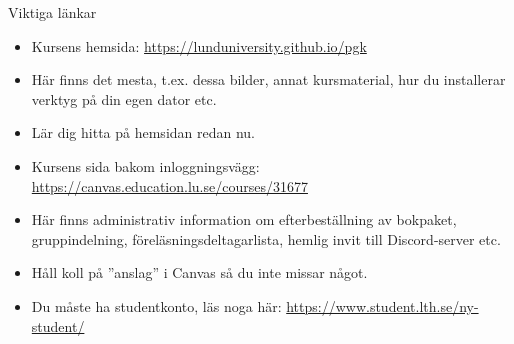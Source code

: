 \begin{SlideExtra}{Viktiga länkar}
  \begin{itemize}
    \item Kursens  hemsida: \url{https://lunduniversity.github.io/pgk}
    \item[] Här finns det mesta, t.ex. dessa bilder, annat kursmaterial, hur du installerar verktyg på din egen dator etc.
    \item[] Lär dig hitta på hemsidan redan nu.
    \item Kursens  sida bakom inloggningsvägg: \url{https://canvas.education.lu.se/courses/31677}
    \item[] Här finns administrativ information om efterbeställning av bokpaket, gruppindelning, föreläsningsdeltagarlista, hemlig invit till Discord-server etc. 
    \item[] Håll koll på ''anslag'' i Canvas så du inte missar något.  
    \item[] Du måste ha studentkonto, läs noga här: \url{https://www.student.lth.se/ny-student/} 
  \end{itemize}
\end{SlideExtra}

\fi


